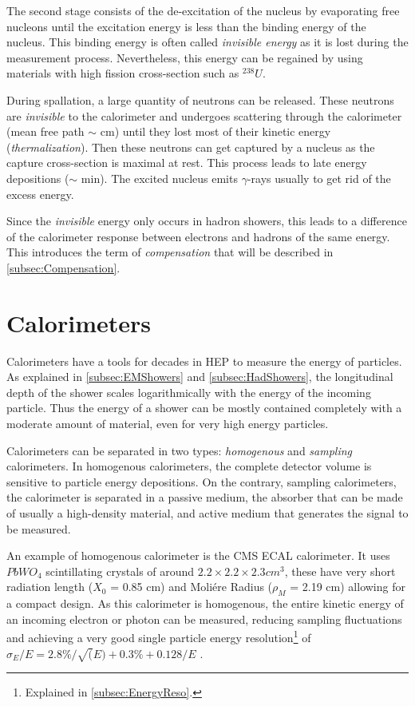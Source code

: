 The second stage consists of the de-excitation of the nucleus by evaporating free nucleons until the excitation energy is less than the binding energy of the nucleus. This binding energy is often called \textit{invisible energy} as it is lost during the measurement process. Nevertheless, this energy can be regained by using materials with high fission cross-section such as $^{238}U$.

During spallation, a large quantity of neutrons can be released. These neutrons are \textit{invisible} to the calorimeter and undergoes scattering through the calorimeter (mean free path $\sim$ cm) until they lost most of their kinetic energy (\textit{thermalization}). Then these neutrons can get captured by a nucleus as the capture cross-section is maximal at rest. This process leads to late energy depositions ($\sim$ min). The excited nucleus emits $\gamma$-rays usually to get rid of the excess energy.

Since the \textit{invisible} energy only occurs in hadron showers, this leads to a difference of the calorimeter response between electrons and hadrons of the same energy. This introduces the term of \textit{compensation} that will be described in \ref{subsec:Compensation}.

\section{Calorimeters}

Calorimeters have a tools for decades in HEP to measure the energy of particles. As explained in \ref{subsec:EMShowers} and \ref{subsec:HadShowers}, the longitudinal depth of the shower scales logarithmically with the energy of the incoming particle. Thus the energy of a shower can be mostly contained completely with a moderate amount of material, even for very high energy particles.

Calorimeters can be separated in two types: \textit{homogenous} and \textit{sampling} calorimeters. In homogenous calorimeters, the complete detector volume is sensitive to particle energy depositions. On the contrary, sampling calorimeters, the calorimeter is separated in a passive medium, the absorber that can be made of usually a high-density material, and active medium that generates the signal to be measured.

An example of homogenous calorimeter is the CMS ECAL calorimeter. It uses $PbWO_4$ scintillating crystals of around $2.2 \times 2.2 \times 2.3 cm^3$, these have very short radiation length ($X_0$ = 0.85 cm) and Moli\'ere Radius ($\rho_M$ = 2.19 cm) allowing for a compact design. As this calorimeter is homogenous, the entire kinetic energy of an incoming electron or photon can be measured, reducing sampling fluctuations and achieving a very good single particle energy resolution\footnote{Explained in \ref{subsec:EnergyReso}.} of $\sigma_E/E = 2.8\%/\sqrt(E) + 0.3\% + 0.128/E$ \cite{1742-6596-587-1-012001}.

